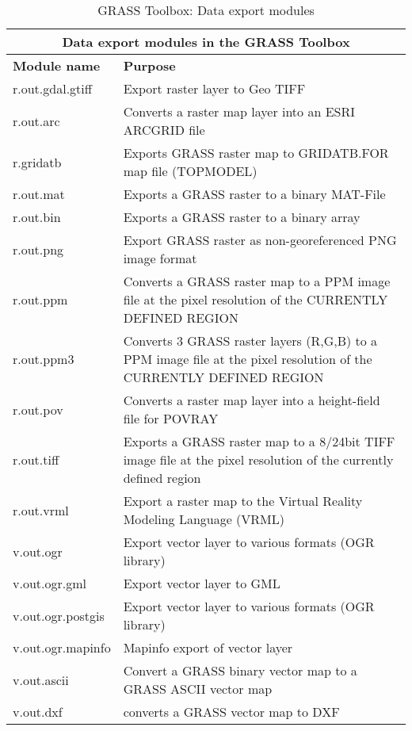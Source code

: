 \begin{table}[ht]
\centering
\caption{GRASS Toolbox: Data export modules}\medskip
 \begin{tabular}{|p{4cm}|p{12cm}|}
  \hline \multicolumn{2}{|c|}{\textbf{Data export modules in the GRASS
  Toolbox}} \\ 
  \hline \textbf{Module name} & \textbf{Purpose} \\
  \hline r.out.gdal.gtiff & Export raster layer to Geo TIFF \\
  \hline r.out.arc & Converts a raster map layer into an ESRI ARCGRID file \\
  \hline r.gridatb & Exports GRASS raster map to GRIDATB.FOR map file
  (TOPMODEL) \\
  \hline r.out.mat & Exports a GRASS raster to a binary MAT-File \\
  \hline r.out.bin & Exports a GRASS raster to a binary array \\
  \hline r.out.png & Export GRASS raster as non-georeferenced PNG image
  format \\
  \hline r.out.ppm & Converts a GRASS raster map to a PPM image file at the
  pixel resolution of the CURRENTLY DEFINED REGION \\
  \hline r.out.ppm3 & Converts 3 GRASS raster layers (R,G,B) to a PPM image
  file at the pixel resolution of the CURRENTLY DEFINED REGION \\
  \hline r.out.pov & Converts a raster map layer into a height-field file for
  POVRAY\\
  \hline r.out.tiff & Exports a GRASS raster map to a 8/24bit TIFF image file
  at the pixel resolution of the currently defined region\\
  \hline r.out.vrml &  Export a raster map to the Virtual Reality Modeling
  Language (VRML)\\
  \hline v.out.ogr & Export vector layer to various formats (OGR library) \\
  \hline v.out.ogr.gml & Export vector layer to GML \\
  \hline v.out.ogr.postgis & Export vector layer to various formats (OGR
  library) \\
  \hline v.out.ogr.mapinfo & Mapinfo export of vector layer \\
  \hline v.out.ascii & Convert a GRASS binary vector map to a GRASS ASCII
  vector map  \\
  \hline v.out.dxf & converts a GRASS vector map to DXF  \\
\hline
\end{tabular}
\end{table}

